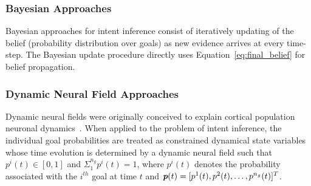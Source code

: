 \documentclass[letterpaper, 10 pt, conference]{ieeeconf}  %
\begin{document}
\subsubsection{Bayesian Approaches}
Bayesian approaches for intent inference consist of iteratively updating of the belief (probability distribution over goals) as new evidence arrives at every time-step. The Bayesian update procedure directly uses Equation~\ref{eq:final_belief} for belief propagation. 


\subsubsection{Dynamic Neural Field Approaches}
Dynamic neural fields were originally conceived to explain cortical population neuronal dynamics~\cite{schoner2008dynamical}. 
When applied to the problem of intent inference, the individual goal probabilities are treated as constrained dynamical state variables whose time evolution is determined by a dynamic neural field such that $p^i(t) \in [0, 1]$ and $\Sigma_{1}^{n_g}p^{i}(t) = 1$, where $p^i(t)$ denotes the probability associated with the $i^{th}$ goal at time $t$ and $\textit{\textbf{p}}(t) = [p^1(t), p^2(t),\dots,p^{n_g}(t) ]^{T}$. 
\end{document}
